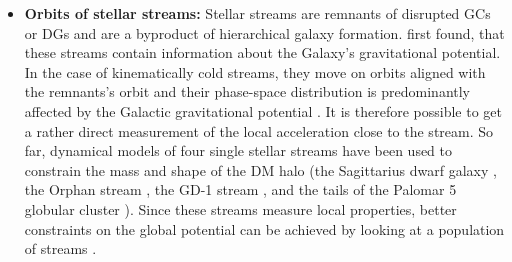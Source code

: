 \begin{itemize}
    \iffalse\item Kinematics of nearby stars: \cite{Kuijken...LocalDMdens...1989, Bovy...LocalDMdens...2012} \fi
    \item \textbf{Orbits of stellar streams:} Stellar streams are remnants of disrupted \acp{GC} or \acp{DG} and are a byproduct of hierarchical galaxy formation. \citet{Johnston...MWstreams...1999} first found, that these streams contain information about the Galaxy's gravitational potential. In the case of kinematically cold streams, they move on orbits aligned with the remnants's orbit \citep{Eyre...streamstheo...2011} and their phase-space distribution is predominantly affected by the Galactic gravitational potential \citep{Kupper...streams...2010, Kupper...streams...2012}. It is therefore possible to get a rather direct measurement of the local acceleration close to the stream. So far, dynamical models of four single stellar streams have been used to constrain the mass and shape of the \ac{DM} halo (the Sagittarius dwarf galaxy \citep{Law...sagstream...2010, Gibbons...sagstream...2014, Dierickx...sagstream..2017}, the Orphan stream \citep{Newberg...orphanstream..2010}, the GD-1 stream \citep{Koposov...GD1stream...2010, Bowden...GD1stream...2015, Malhan...GD1stream...2018}, and the tails of the Palomar 5 globular cluster \citep{Kupper...pal5stream...2015}). Since these streams measure local properties, better constraints on the global potential can be achieved by looking at a population of streams \citep{Bonaca...streamsinfo...2018}.
    

\end{itemize}
